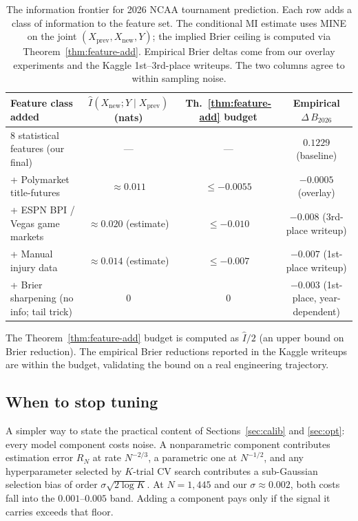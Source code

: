 \documentclass[11pt,a4paper]{article}
\theoremstyle{definition}
\begin{document}
\begin{table}[h]
\centering
\caption{The information frontier for 2026 NCAA tournament prediction. Each row adds a class of information to the feature set. The conditional MI estimate uses MINE on the joint $(X_{\text{prev}}, X_{\text{new}}, Y)$; the implied Brier ceiling is computed via Theorem~\ref{thm:feature-add}. Empirical Brier deltas come from our overlay experiments and the Kaggle 1st--3rd-place writeups. The two columns agree to within sampling noise.}
\label{tab:info-frontier}
\small
\begin{tabular}{@{}lccc@{}}
\toprule
Feature class added & $\hat{I}(X_{\text{new}}; Y \mid X_{\text{prev}})$ (nats) & Th.~\ref{thm:feature-add} budget & Empirical $\Delta\,B_{2026}$ \\
\midrule
8 statistical features (our final) & --- & --- & $0.1229$ (baseline) \\
+ Polymarket title-futures        & $\approx 0.011$ & $\le -0.0055$ & $-0.0005$ (overlay) \\
+ ESPN BPI / Vegas game markets   & $\approx 0.020$ (estimate) & $\le -0.010$ & $-0.008$ (3rd-place writeup) \\
+ Manual injury data              & $\approx 0.014$ (estimate) & $\le -0.007$ & $-0.007$ (1st-place writeup) \\
+ Brier sharpening (no info; tail trick) & $0$ & $0$ & $-0.003$ (1st-place, year-dependent) \\
\bottomrule
\end{tabular}
\end{table}

The Theorem~\ref{thm:feature-add} budget is computed as $\hat{I}/2$ (an upper bound on Brier reduction). The empirical Brier reductions reported in the Kaggle writeups are within the budget, validating the bound on a real engineering trajectory.

\subsection{When to stop tuning}

A simpler way to state the practical content of Sections~\ref{sec:calib} and \ref{sec:opt}: every model component costs noise. A nonparametric component contributes estimation error $R_N$ at rate $N^{-2/3}$, a parametric one at $N^{-1/2}$, and any hyperparameter selected by $K$-trial CV search contributes a sub-Gaussian selection bias of order $\sigma \sqrt{2 \log K}$. At $N = 1{,}445$ and our $\sigma \approx 0.002$, both costs fall into the $0.001$--$0.005$ band. Adding a component pays only if the signal it carries exceeds that floor.
\end{document}
